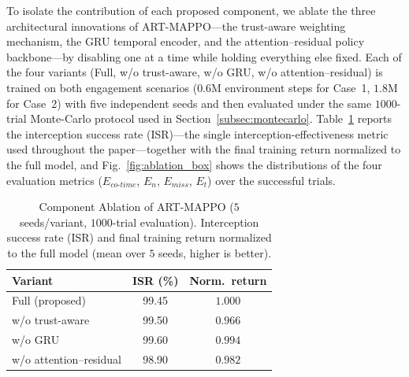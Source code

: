 \documentclass[lettersize,journal]{IEEEtran}
\newcommand{\hladd}[1]{{\color{blue}#1}}
\begin{document}
\hladd{To isolate the contribution of each proposed component, we ablate the three architectural
innovations of ART-MAPPO---the trust-aware weighting mechanism, the GRU temporal encoder, and the
attention--residual policy backbone---by disabling one at a time while holding everything else fixed.
Each of the four variants (Full, w/o trust-aware, w/o GRU, w/o attention--residual) is trained on both
engagement scenarios ($0.6$M environment steps for Case~1, $1.8$M for Case~2) with five independent
seeds and then evaluated under the same $1000$-trial Monte-Carlo protocol used in
Section~\ref{subsec:montecarlo}. Table~\ref{tab:ablation} reports the interception success rate
(ISR)---the single interception-effectiveness metric used throughout the paper---together with the
final training return normalized to the full model, and Fig.~\ref{fig:ablation_box} shows
the distributions of the four evaluation metrics ($E_{co\text{-}time}$, $E_n$, $E_{miss}$, $E_t$) over
the successful trials.}

\begin{table}[!t]
\centering
\renewcommand{\arraystretch}{1.35}
\caption{\hladd{Component Ablation of ART-MAPPO ($5$ seeds/variant, $1000$-trial evaluation).
Interception success rate (ISR) and final training return normalized to the full model
(mean over $5$ seeds, higher is better).}}
\label{tab:ablation}
\hladd{
\begin{tabular}{lcc}
\hline\hline
Variant & ISR (\%) & Norm.\ return \\ \hline
Full (proposed)          & 99.45 & $1.000$ \\
w/o trust-aware          & 99.50 & $0.966$ \\
w/o GRU                  & 99.60 & $0.994$ \\
w/o attention--residual  & 98.90 & $0.982$ \\ \hline
\end{tabular}}
\end{table}
\end{document}
